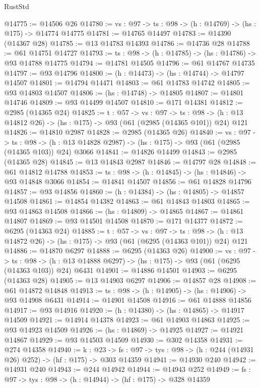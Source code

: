 \begin{lexlean}{RustStd}
\begin{coremodule}
@14775 := @14506 @26
@14780 := {vs : @97} -> {ts : @98} -> (h : @14769) -> (hs : @175) -> @14774 @14775
@14781 := @14765 @14497
@14783 := @14390 (@14367 @28)
@14785 := @13 @14783 @14393
@14786 := @14736 @28
@14788 := @61 @14751 @14727
@14793 := {ts : @98} -> (h : @14785) -> (hs : @14786) -> @93 @14788 @14775
@14794 := @14781 @14505
@14796 := @61 @14767 @14735
@14797 := @93 @14796
@14800 := (h : @14473) -> (hs : @14744) -> @14797 @14507
@14801 := @14794 @14471
@14803 := @61 @14783 @14742
@14805 := @93 @14803 @14507
@14806 := (hs : @14748) -> @14805
@14807 := @14801 @14746
@14809 := @93 @14499 @14507
@14810 := @171 @14381
@14812 := @2985 (@14365 @24)
@14825 := {t : @57} ->
  {vs : @97} ->
  {ts : @98} -> (h : @13 @14812 @26) -> (hs : @175) -> @93 (@61 (@2985 (@14365 @101)) @24) @121
@14826 := @14810 @2987
@14828 := @2985 (@14365 @26)
@14840 := {vs : @97} ->
  {ts : @98} -> (h : @13 @14828 @2987) -> (hs : @175) -> @93 (@61 (@2985 (@14365 @103)) @24) @3066
@14841 := @14826 @14499
@14843 := @2985 (@14365 @28)
@14845 := @13 @14843 @2987
@14846 := @14797 @28
@14848 := @61 @14812 @14788
@14853 := {ts : @98} -> (h : @14845) -> (hs : @14846) -> @93 @14848 @3066
@14854 := @14841 @14507
@14856 := @61 @14828 @14796
@14857 := @93 @14856
@14860 := (h : @14384) -> (hs : @14805) -> @14857 @14508
@14861 := @14854 @14382
@14863 := @61 @14843 @14803
@14865 := @93 @14863 @14508
@14866 := (hs : @14809) -> @14865
@14867 := @14861 @14807
@14869 := @93 @14501 @14508
@14870 := @171 @14377
@14872 := @6295 (@14363 @24)
@14885 := {t : @57} ->
  {vs : @97} ->
  {ts : @98} -> (h : @13 @14872 @26) -> (hs : @175) -> @93 (@61 (@6295 (@14363 @101)) @24) @121
@14886 := @14870 @6297
@14888 := @6295 (@14363 @26)
@14900 := {vs : @97} ->
  {ts : @98} -> (h : @13 @14888 @6297) -> (hs : @175) -> @93 (@61 (@6295 (@14363 @103)) @24) @6431
@14901 := @14886 @14501
@14903 := @6295 (@14363 @28)
@14905 := @13 @14903 @6297
@14906 := @14857 @28
@14908 := @61 @14872 @14848
@14913 := {ts : @98} -> (h : @14905) -> (hs : @14906) -> @93 @14908 @6431
@14914 := @14901 @14508
@14916 := @61 @14888 @14856
@14917 := @93 @14916
@14920 := (h : @14380) -> (hs : @14865) -> @14917 @14509
@14921 := @14914 @14378
@14923 := @61 @14903 @14863
@14925 := @93 @14923 @14509
@14926 := (hs : @14869) -> @14925
@14927 := @14921 @14867
@14929 := @93 @14503 @14509
@14930 := @302 @14358
@14931 := @274 @14358
@14940 := {k : @23} ->
  {fs : @97} -> {tys : @98} -> (h : @244 (@14931 @26) @252) -> (hf : @175) -> @303 @14359
@14941 := @14930 @240
@14942 := @14931 @240
@14943 := @244 @14942
@14944 := @14943 @252
@14949 := {fs : @97} -> {tys : @98} -> (h : @14944) -> (hf : @175) -> @328 @14359

\end{coremodule}
\end{lexlean}
